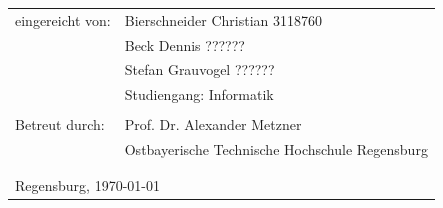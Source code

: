 \hskip 2.0cm
\begin{small}
\begin{tabular}{ll}
eingereicht von:\hspace{0.7cm} & Bierschneider Christian  3118760\tabularnewline
\hspace{0.7cm} & Beck Dennis  ??????\tabularnewline
\hspace{0.7cm} & Stefan Grauvogel  ??????\tabularnewline
 & Studiengang: Informatik\tabularnewline
 & \tabularnewline
 
 
Betreut durch: & Prof. Dr. Alexander Metzner\tabularnewline
 & Ostbayerische Technische Hochschule Regensburg\tabularnewline
 & \tabularnewline
  & \tabularnewline
\multicolumn{2}{l}{Regensburg, \today}\tabularnewline
\end{tabular}
\end{small}
